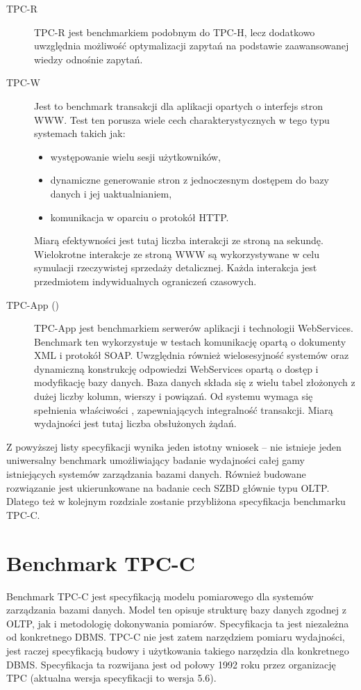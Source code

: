 \begin{description}
\item[TPC-R] 
TPC-R jest benchmarkiem podobnym do TPC-H, lecz dodatkowo uwzględnia możliwość optymalizacji zapytań na podstawie
zaawansowanej wiedzy odnośnie zapytań.

\item[TPC-W]
Jest to benchmark transakcji dla aplikacji opartych o interfejs stron WWW. Test ten porusza wiele
cech charakterystycznych w tego typu systemach takich jak:
\begin{itemize}
    \item występowanie wielu sesji użytkowników,
    \item dynamiczne generowanie stron z jednoczesnym dostępem do bazy danych i jej uaktualnianiem,
    \item komunikacja w oparciu o protokół HTTP.
\end{itemize}
Miarą efektywności jest tutaj liczba interakcji ze stroną na sekundę. Wielokrotne interakcje ze stroną WWW
są wykorzystywane w celu symulacji rzeczywistej sprzedaży detalicznej. Każda interakcja jest przedmiotem
indywidualnych ograniczeń czasowych.

\item[TPC-App ()]
TPC-App jest benchmarkiem serwerów aplikacji i technologii WebServices. Benchmark ten wykorzystuje w testach
komunikację opartą o dokumenty XML i protokół SOAP. Uwzględnia również wielosesyjność systemów oraz
dynamiczną konstrukcję odpowiedzi WebServices opartą o dostęp i modyfikację bazy danych. Baza danych składa się z
wielu tabel złożonych z dużej liczby kolumn, wierszy i powiązań. Od systemu wymaga się spełnienia właściwości 
, zapewniających integralność transakcji. Miarą wydajności jest tutaj liczba obsłużonych
żądań.
\end{description}

Z powyższej listy specyfikacji wynika jeden istotny wniosek -- nie istnieje 
jeden uniwersalny benchmark umożliwiający badanie wydajności całej gamy istniejących
systemów zarządzania bazami danych. Również budowane rozwiązanie jest ukierunkowane
na badanie cech SZBD głównie typu OLTP. Dlatego też w kolejnym rozdziale zostanie
przybliżona specyfikacja benchmarku TPC-C.

\section{Benchmark TPC-C}

Benchmark TPC-C jest specyfikacją modelu pomiarowego dla systemów zarządzania bazami danych. 
Model ten opisuje strukturę bazy danych zgodnej z OLTP, jak i metodologię dokonywania pomiarów.
Specyfikacja ta jest niezależna od konkretnego DBMS. TPC-C nie jest zatem narzędziem pomiaru wydajności,
jest raczej specyfikacją budowy i użytkowania takiego narzędzia dla konkretnego DBMS. Specyfikacja 
ta rozwijana jest od połowy 1992 roku przez organizację TPC (aktualna wersja specyfikacji to wersja 5.6).


